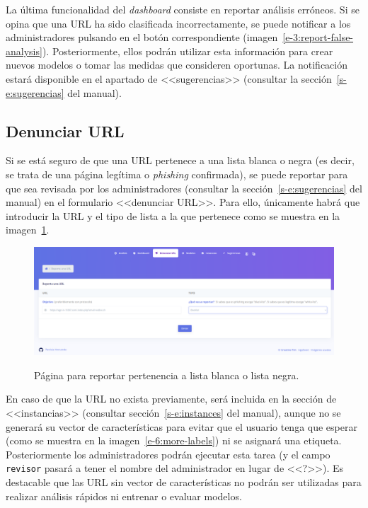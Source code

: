 \label{s-e:report-false-analy}
La última funcionalidad del \textit{dashboard} consiste en reportar análisis erróneos. Si se opina que una URL ha sido clasificada incorrectamente, se puede notificar a los administradores pulsando en el botón correspondiente (imagen~\ref{e-3:report-false-analysis}). Posteriormente, ellos podrán utilizar esta información para crear nuevos modelos o tomar las medidas que consideren oportunas. La notificación estará disponible en el apartado de <<sugerencias>> (consultar la sección~\ref{s-e:sugerencias} del manual).

\subsection{Denunciar URL}
\label{s-e:report-url}

Si se está seguro de que una URL pertenece a una lista blanca o negra (es decir, se trata de una página legítima o \textit{phishing} confirmada), se puede reportar para que sea revisada por los administradores (consultar la sección~\ref{s-e:sugerencias} del manual) en el formulario <<denunciar URL>>. Para ello, únicamente habrá que introducir la URL y el tipo de lista a la que pertenece como se muestra en la imagen~\ref{e-3:report-url}.

\begin{figure}[h]
	\caption[Manual de usuario: reportar pertenencia a lista]{Página para reportar pertenencia a lista blanca o lista negra.}
	\centering
	\includegraphics[width=\textwidth]{../img/anexos/user_guide/4_report_url}
	\label{e-3:report-url}
\end{figure}

En caso de que la URL no exista previamente, será incluida en la sección de <<instancias>> (consultar sección~\ref{s-e:instances} del manual), aunque no se generará su vector de características para evitar que el usuario tenga que esperar (como se muestra en la imagen~\ref{e-6:more-labels}) ni se asignará una etiqueta. Posteriormente los administradores podrán ejecutar esta tarea (y el campo \texttt{revisor} pasará a tener el nombre del administrador en lugar de <<?>>). Es destacable que las URL sin vector de características no podrán ser utilizadas para realizar análisis rápidos ni entrenar o evaluar modelos.

